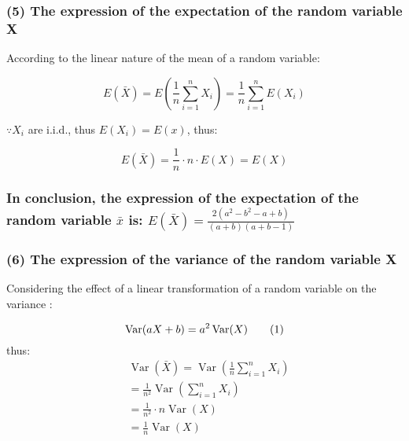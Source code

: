 \documentclass[
]{article}
\begin{document}
\subsubsection{(5) The expression of the expectation of the random
variable
X}\label{the-expression-of-the-expectation-of-the-random-variable-x}

According to the linear nature of the mean of a random variable:

\[
\begin{equation*}
E(\bar{X})=E\left(\frac{1}{n} \sum_{i=1}^{n} X_{i}\right)=\frac{1}{n} \sum_{i=1}^{n} E\left(X_{i}\right) \tag{1}
\end{equation*}
\]

\(\because X_{i}\) are i.i.d., thus \(E\left(X_{i}\right)=E(x)\), thus:

\[
\begin{equation*}
E(\bar{X})=\frac{1}{n} \cdot n \cdot E(X)=E(X) \tag{2} 
\end{equation*}
\]

\subsubsection{\texorpdfstring{In conclusion, the expression of the
expectation of the random variable \(\bar{x}\) is:
\(E(\bar{X})=\frac{2\left(a^{2}-b^{2}-a+b\right)}{(a+b)(a+b-1)}\)}{In conclusion, the expression of the expectation of the random variable \textbackslash bar\{x\} is: E(\textbackslash bar\{X\})=\textbackslash frac\{2\textbackslash left(a\^{}\{2\}-b\^{}\{2\}-a+b\textbackslash right)\}\{(a+b)(a+b-1)\}}}\label{in-conclusion-the-expression-of-the-expectation-of-the-random-variable-barx-is-ebarxfrac2lefta2-b2-abrightabab-1}

\subsubsection{(6) The expression of the variance of the random variable
X}\label{the-expression-of-the-variance-of-the-random-variable-x}

Considering the effect of a linear transformation of a random variable
on the variance :

\[
\begin{equation*}
\operatorname{Var}(a X+b)=a^{2} \operatorname{Var}(X)  \tag{1}\\
\end{equation*}
\] thus: \[
\begin{align*}
&\operatorname{Var}(\bar{X})=\operatorname{Var}\left(\frac{1}{n} \sum_{i=1}^{n} X_{i}\right) \\
&=\frac{1}{n^{2}} \operatorname{Var}\left(\sum_{i=1}^{n} X_{i}\right) \\
&=\frac{1}{n^{2}} \cdot n \operatorname{Var}(X) \\
&=\frac{1}{n} \operatorname{Var}(X) \tag{2}
\end{align*}
\]
\end{document}
